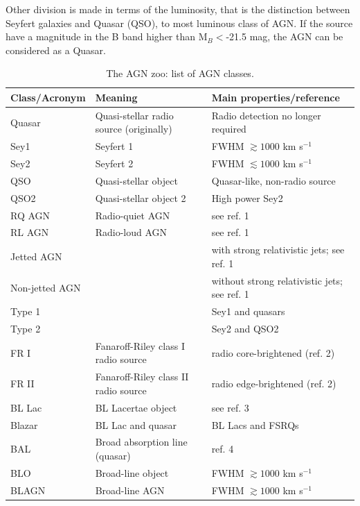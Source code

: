 Other division is made in terms of the luminosity, that is the distinction between Seyfert galaxies and Quasar (QSO), to most luminous class of AGN. If the source have a magnitude in the B band higher than M$_{B}<$-21.5 mag, the AGN can be considered as a Quasar.


%
\begin{tiny}


\begin{table} %
\begin{center}
\caption{The AGN zoo: list of AGN classes.}
\begin{tabular}{lll}
\hline
Class/Acronym & Meaning & Main properties/reference\\
\hline
Quasar &Quasi-stellar radio source (originally) & Radio detection no longer required \\
Sey1 & Seyfert 1 & FWHM $\gtrsim 1000$ km s$^{-1}$ \\
Sey2 & Seyfert 2 & FWHM $\lesssim 1000$ km s$^{-1}$  \\
QSO &Quasi-stellar object & Quasar-like, non-radio source \\
QSO2 &Quasi-stellar object 2 & High power Sey2\\
RQ AGN & Radio-quiet AGN & see ref. 1\\
RL AGN & Radio-loud AGN & see ref. 1\\
Jetted AGN & & with strong relativistic jets;  see ref. 1\\
Non-jetted AGN & & without strong relativistic jets;  see ref. 1\\
Type 1 & & Sey1 and quasars\\
Type 2 & & Sey2 and QSO2\\
FR I &Fanaroff-Riley class I radio source & radio core-brightened (ref. 2)\\
FR II &Fanaroff-Riley class II radio source & radio edge-brightened (ref. 2)\\
BL Lac & BL Lacertae object & see ref. 3\\
Blazar & BL Lac and quasar & BL Lacs and FSRQs\\
\hline
BAL & Broad absorption line (quasar) & ref. 4\\
BLO &Broad-line object & FWHM $\gtrsim 1000$ km s$^{-1}$   \\
BLAGN &Broad-line AGN & FWHM $\gtrsim 1000$ km s$^{-1}$  \\

\end{tabular}
\end{center}
\end{table}
\end{tiny}

